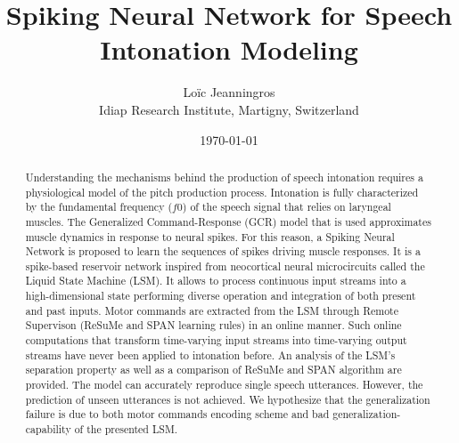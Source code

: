 \documentclass[11pt, a4paper]{article} %
\title{Spiking Neural Network for Speech Intonation Modeling} %
\author{
Lo\"{i}c Jeanningros %
\\
Idiap Research Institute, Martigny, Switzerland
  }
\date{\small \today} %
\begin{document}
%

\maketitle %



\setcounter{page}{1} %



\begin{abstract}
Understanding the mechanisms behind the production of speech intonation requires a physiological model of the pitch production process. Intonation is fully characterized by the fundamental frequency ($f0$) of the speech signal that relies on laryngeal muscles. The Generalized Command-Response (GCR) model that is used approximates muscle dynamics in response to neural spikes. For this reason, a Spiking Neural Network is proposed to learn the sequences of spikes driving muscle responses. It is a spike-based reservoir network inspired from neocortical neural microcircuits called the Liquid State Machine (LSM). It allows to process continuous input streams into a high-dimensional state performing diverse operation and integration of both present and past inputs. Motor commands are extracted from the LSM through Remote Supervison (ReSuMe and SPAN learning rules) in an online manner. Such online computations that transform time-varying input streams into time-varying output streams have never been applied to intonation before. An analysis of the LSM's separation property as well as a comparison of ReSuMe and SPAN algorithm are provided. The model can accurately reproduce single speech utterances. However, the prediction of unseen utterances is not achieved. We hypothesize that the generalization failure is due to both motor commands encoding scheme and bad generalization-capability of the presented LSM.
\end{abstract}


\end{document}
